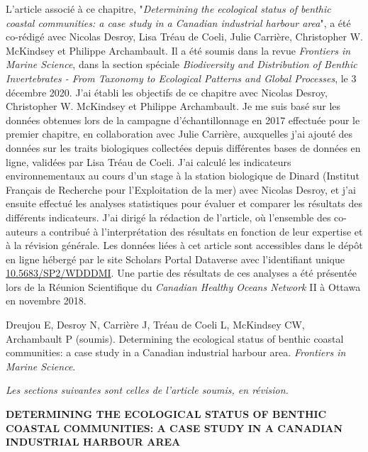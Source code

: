L'article associé à ce chapitre, "\textit{Determining the ecological status of benthic coastal communities: a case study in a Canadian industrial harbour area}", a été co-rédigé avec Nicolas Desroy, Lisa Tréau de Coeli, Julie Carrière, Christopher W. McKindsey et Philippe Archambault. Il a été soumis dans la revue \textit{Frontiers in Marine Science}, dans la section spéciale \textit{Biodiversity and Distribution of Benthic Invertebrates - From Taxonomy to Ecological Patterns and Global Processes}, le 3 décembre 2020. J'ai établi les objectifs de ce chapitre avec Nicolas Desroy, Christopher W. McKindsey et Philippe Archambault. Je me suis basé sur les données obtenues lors de la campagne d'échantillonnage en 2017 effectuée pour le premier chapitre, en collaboration avec Julie Carrière, auxquelles j'ai ajouté des données sur les traits biologiques collectées depuis différentes bases de données en ligne, validées par Lisa Tréau de Coeli. J'ai calculé les indicateurs environnementaux au cours d'un stage à la station biologique de Dinard (Institut Français de Recherche pour l'Exploitation de la mer) avec Nicolas Desroy, et j'ai ensuite effectué les analyses statistiques pour évaluer et comparer les résultats des différents indicateurs. J'ai dirigé la rédaction de l'article, où l'ensemble des co-auteurs a contribué à l'interprétation des résultats en fonction de leur expertise et à la révision générale. Les données liées à cet article sont accessibles dans le dépôt en ligne hébergé par le site Scholars Portal Dataverse avec l'identifiant unique \href{https://doi.org/10.5683/SP2/WDDDMI}{10.5683/SP2/WDDDMI}. Une partie des résultats de ces analyses a été présentée lors de la Réunion Scientifique du \textit{Canadian Healthy Oceans Network} II à Ottawa en novembre 2018. \linebreak[4]

\begin{singlespace}
Dreujou E, Desroy N, Carrière J, Tréau de Coeli L, McKindsey CW, Archambault P (soumis). Determining the ecological status of benthic coastal communities: a case study in a Canadian industrial harbour area. \textit{Frontiers in Marine Science}.
\end{singlespace}

\textit{Les sections suivantes sont celles de l'article soumis, en révision.}

\clearpage

\begin{center}
\textbf{DETERMINING THE ECOLOGICAL STATUS OF BENTHIC COASTAL COMMUNITIES: A CASE STUDY IN A CANADIAN INDUSTRIAL HARBOUR AREA}
\end{center}
